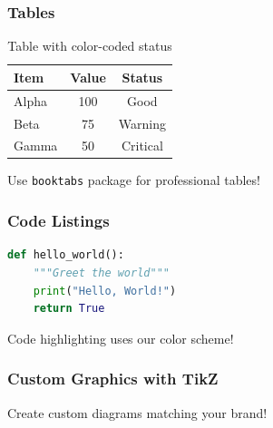 \documentclass{beamer}
\begin{document}
\begin{frame}
\frametitle{Tables}

\begin{table}
\centering
\begin{tabular}{lcc}
\toprule
\textbf{Item} & \textbf{Value} & \textbf{Status} \\
\midrule
Alpha & 100 & \textcolor{success}{Good} \\
Beta & 75 & \textcolor{warning}{Warning} \\
Gamma & 50 & \textcolor{error}{Critical} \\
\bottomrule
\end{tabular}
\caption{Table with color-coded status}
\end{table}

Use \texttt{booktabs} package for professional tables!
\end{frame}

\begin{frame}[fragile]
\frametitle{Code Listings}

\begin{lstlisting}[language=Python,
                   basicstyle=\ttfamily\small,
                   keywordstyle=\color{primary},
                   commentstyle=\color{textSecondary},
                   stringstyle=\color{secondary}]
def hello_world():
    """Greet the world"""
    print("Hello, World!")
    return True
\end{lstlisting}

Code highlighting uses our color scheme!
\end{frame}


\begin{frame}
\frametitle{Custom Graphics with TikZ}
\centering


\vspace{1em}
Create custom diagrams matching your brand!
\end{frame}
\end{document}
